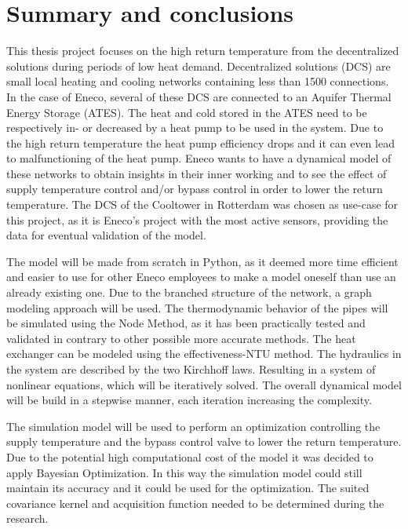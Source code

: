 \chapter{Summary and conclusions}
This thesis project focuses on the high return temperature from the decentralized solutions during periods of low heat demand. Decentralized solutions (DCS) are small local heating and cooling networks containing less than 1500 connections. In the case of Eneco, several of these DCS are connected to an Aquifer Thermal Energy Storage (ATES). The heat and cold stored in the ATES need to be respectively in- or decreased by a heat pump to be used in the system. Due to the high return temperature the heat pump efficiency drops and it can even lead to malfunctioning of the heat pump. Eneco wants to have a dynamical model of these networks to obtain insights in their inner working and to see the effect of supply temperature control and/or bypass control in order to lower the return temperature. The DCS of the Cooltower in Rotterdam was chosen as use-case for this project, as it is Eneco's project with the most active sensors, providing the data for eventual validation of the model. 

The model will be made from scratch in Python, as it deemed more time efficient and easier to use for other Eneco employees to make a model oneself than use an already existing one. Due to the branched structure of the network, a graph modeling approach will be used. The thermodynamic behavior of the pipes will be simulated using the Node Method, as it has been practically tested and validated in contrary to other possible more accurate methods. The heat exchanger can be modeled using the effectiveness-NTU method. The hydraulics in the system are described by the two Kirchhoff laws. Resulting in a system of nonlinear equations, which will be iteratively solved. The overall dynamical model will be build in a stepwise manner, each iteration increasing the complexity. 

The simulation model will be used to perform an optimization controlling the supply temperature and the bypass control valve to lower the return temperature. Due to the potential high computational cost of the model it was decided to apply Bayesian Optimization. In this way the simulation model could still maintain its accuracy and it could be used for the optimization. The suited covariance kernel and acquisition function needed to be determined during the research. 

